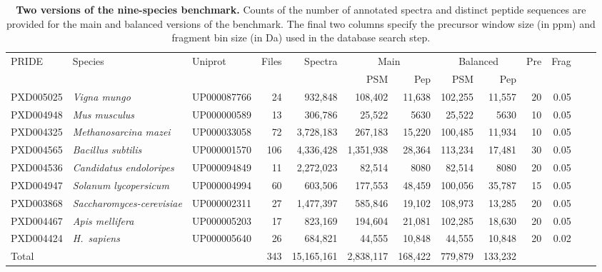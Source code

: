 \documentclass{article}
\begin{document}
\begin{table}
  \centering
  \scriptsize
\begin{tabular}{lllrrrrrrrrrr}
\hline
PRIDE & Species & Uniprot & Files & Spectra &
\multicolumn{2}{c}{Main} & \multicolumn{2}{c}{Balanced} & Pre & Frag \\
& & & & & PSM & Pep  & PSM & Pep  \\
\hline
PXD005025 & \textit{Vigna mungo} & UP000087766 & 24 & 932,848 &
108,402 & 11,638 & 102,255 & 11,557
& 20 & 0.05 \\
PXD004948 & \textit{Mus musculus} & UP000000589 & 13 & 306,786 & 
25,522 & 5630 & 25,522 & 5630
& 10 & 0.05 \\
PXD004325 & \textit{Methanosarcina mazei} & UP000033058  & 72 & 3,728,183 &
267,183 & 15,220 & 100,485 & 11,934
& 10 & 0.05 \\
PXD004565 & \textit{Bacillus subtilis} & UP000001570 & 106 & 4,336,428 &
1,351,938 & 28,364 & 113,234 & 17,481
& 30 & 0.05 \\
PXD004536 & \textit{Candidatus endoloripes} & UP000094849 & 11 & 2,272,023 &
82,514 & 8080 & 82,514 & 8080
& 20 & 0.05 \\
PXD004947 & \textit{Solanum lycopersicum} & UP000004994 & 60 & 603,506 &
177,553 & 48,459 & 100,056 & 35,787
& 15 & 0.05 \\
PXD003868 & \textit{Saccharomyces-cerevisiae} & UP000002311 & 27 & 1,477,397 &
585,846 & 19,102 & 108,973 & 13,285
& 20 & 0.05 \\
PXD004467 & \textit{Apis mellifera} & UP000005203 & 17 & 823,169 &
194,604 & 21,081 & 102,285 & 18,630
& 20 & 0.05 \\
PXD004424 & \textit{H.\ sapiens} & UP000005640 & 26 & 684,821 &
44,555 & 10,848 & 44,555 & 10,848
& 20 & 0.02 \\
\hline
Total & & & 343 & 15,165,161  & 2,838,117 & 168,422 & 779,879 & 133,232 \\
\end{tabular}
\caption{{\bf Two versions of the nine-species benchmark.}
  Counts of the number of annotated spectra and distinct peptide sequences are provided for the main and balanced versions of the benchmark.
The final two columns specify the precursor window size (in ppm) and fragment bin size (in Da) used in the database search step.
}
\label{tab:benchmark}
\end{table}
\end{document}
